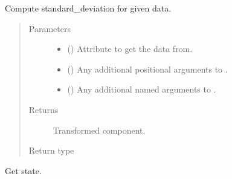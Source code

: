 \documentclass[letterpaper,10pt,english]{sphinxmanual}
\begin{document}
\begin{fulllineitems}
\begin{fulllineitems}
\label{\detokenize{api/rock:geology.src.Rock.standard_deviation}}
Compute standard\_deviation for given data.
\begin{quote}\begin{description}
\item[{Parameters}] \leavevmode\begin{itemize}
\item {} 
 (\sphinxstyleliteralemphasis{\sphinxupquote{, }}) \textendash{} Attribute to get the data from.

\item {} 
 () \textendash{} Any additional positional arguments to .

\item {} 
 () \textendash{} Any additional named arguments to .

\end{itemize}

\item[{Returns}] \leavevmode
{} \textendash{} Transformed component.

\item[{Return type}] \leavevmode
{\hyperref[\detokenize{api/base_classes:geology.src.base_spatial.SpatialComponent}]{}}

\end{description}\end{quote}

\end{fulllineitems}


\begin{fulllineitems}
\label{\detokenize{api/rock:geology.src.Rock.state}}
Get state.


\end{fulllineitems}
\end{fulllineitems}
\end{document}
